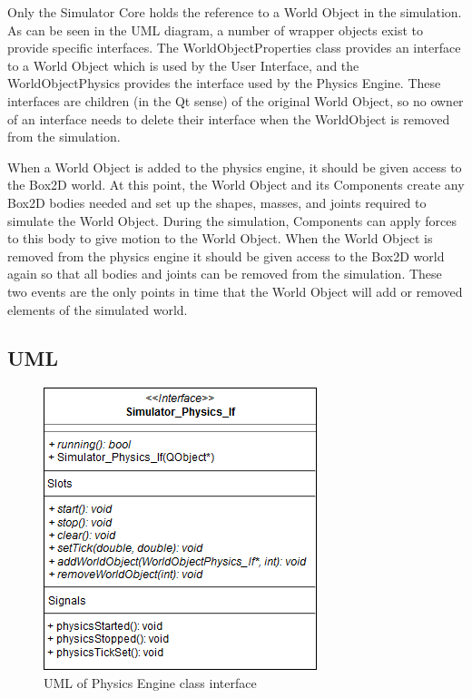 	Only the Simulator Core holds the reference to a World Object in the simulation. As can be seen in the UML diagram, a number of wrapper objects exist to provide specific interfaces. The WorldObjectProperties class provides an interface to a World Object which is used by the User Interface, and the WorldObjectPhysics provides the interface used by the Physics Engine. These interfaces are children (in the Qt sense) of the original World Object, so no owner of an interface needs to delete their interface when the WorldObject is removed from the simulation.
	
	When a World Object is added to the physics engine, it should be given access to the Box2D world. At this point, the World Object and its Components create any Box2D bodies needed and set up the shapes, masses, and joints required to simulate the World Object. During the simulation, Components can apply forces to this body to give motion to the World Object. When the World Object is removed from the physics engine it should be given access to the Box2D world again so that all bodies and joints can be removed from the simulation. These two events are the only points in time that the World Object will add or removed elements of the simulated world.
 
 \subsection{UML}
 \begin{figure}
 	\begin{center}
 	\includegraphics[scale=0.5]{./images_design/uml/Physics_Engine_If}
 	\caption{UML of Physics Engine class interface\label{uml:phys_if}}
 	\end{center}
 \end{figure}
 
